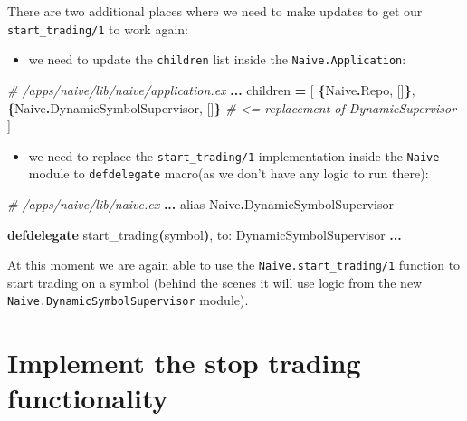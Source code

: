 \documentclass[
  oneside]{book}
\newenvironment{Shaded}{\begin{snugshade}}{\end{snugshade}}
\newcommand{\CommentTok}[1]{\textcolor[rgb]{0.56,0.35,0.01}{\textit{#1}}}
\newcommand{\ConstantTok}[1]{\textcolor[rgb]{0.56,0.35,0.01}{#1}}
\newcommand{\FunctionTok}[1]{\textcolor[rgb]{0.13,0.29,0.53}{\textbf{#1}}}
\newcommand{\ImportTok}[1]{#1}
\newcommand{\KeywordTok}[1]{\textcolor[rgb]{0.13,0.29,0.53}{\textbf{#1}}}
\newcommand{\NormalTok}[1]{#1}
\newcommand{\OperatorTok}[1]{\textcolor[rgb]{0.81,0.36,0.00}{\textbf{#1}}}
\newcommand{\OtherTok}[1]{\textcolor[rgb]{0.56,0.35,0.01}{#1}}
\newcommand{\VariableTok}[1]{\textcolor[rgb]{0.00,0.00,0.00}{#1}}
\providecommand{\tightlist}{%
  \setlength{\itemsep}{0pt}\setlength{\parskip}{0pt}}
\begin{document}
There are two additional places where we need to make updates to get our \texttt{start\_trading/1} to work again:

\begin{itemize}
\tightlist
\item
  we need to update the \texttt{children} list inside the \texttt{Naive.Application}:
\end{itemize}

\begin{Shaded}
\begin{Highlighting}[]
\CommentTok{\# /apps/naive/lib/naive/application.ex}
    \OperatorTok{...}
\NormalTok{    children }\OperatorTok{=} \OtherTok{[}
      \FunctionTok{\{}\ConstantTok{Naive}\OperatorTok{.}\ConstantTok{Repo}\NormalTok{, }\OtherTok{[]}\FunctionTok{\}}\NormalTok{,}
      \FunctionTok{\{}\ConstantTok{Naive}\OperatorTok{.}\ConstantTok{DynamicSymbolSupervisor}\NormalTok{, }\OtherTok{[]}\FunctionTok{\}} \CommentTok{\# \textless{}= replacement of DynamicSupervisor}
    \OtherTok{]}
\end{Highlighting}
\end{Shaded}

\begin{itemize}
\tightlist
\item
  we need to replace the \texttt{start\_trading/1} implementation inside the \texttt{Naive} module to \texttt{defdelegate} macro(as we don't have any logic to run there):
\end{itemize}

\begin{Shaded}
\begin{Highlighting}[]
\CommentTok{\# /apps/naive/lib/naive.ex}
\OperatorTok{...}
  \ImportTok{alias} \ConstantTok{Naive}\OperatorTok{.}\ConstantTok{DynamicSymbolSupervisor}

  \KeywordTok{defdelegate}\NormalTok{ start\_trading}\FunctionTok{(}\NormalTok{symbol}\FunctionTok{)}\NormalTok{, }\VariableTok{to:} \ConstantTok{DynamicSymbolSupervisor}
\OperatorTok{...}
\end{Highlighting}
\end{Shaded}

At this moment we are again able to use the \texttt{Naive.start\_trading/1} function to start trading on a symbol (behind the scenes it will use logic from the new \texttt{Naive.DynamicSymbolSupervisor} module).

\section{Implement the stop trading functionality}\label{implement-the-stop-trading-functionality}
\end{document}
